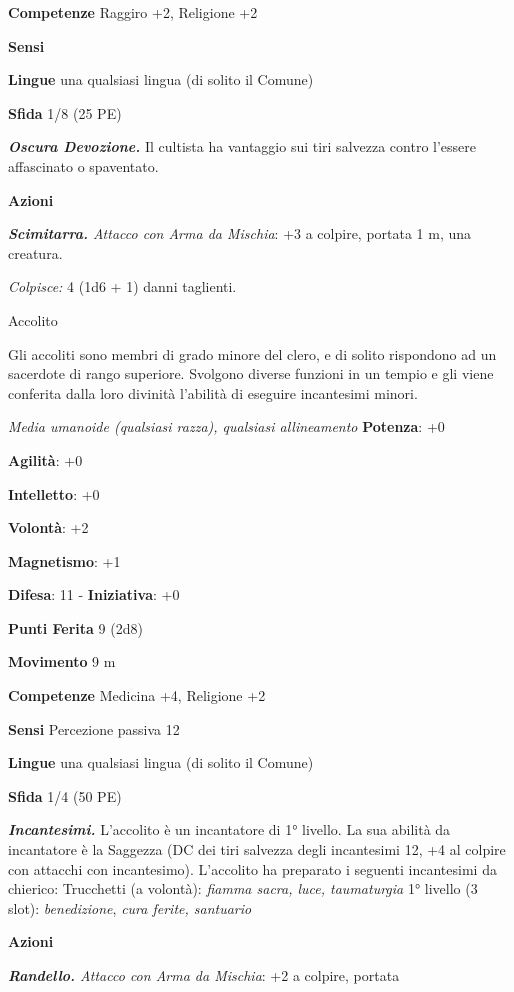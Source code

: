 \begin{multicols}{2}
\textbf{Competenze} Raggiro +2, Religione +2

\textbf{Sensi} 

\textbf{Lingue} una qualsiasi lingua (di solito il Comune)

\textbf{Sfida} 1/8 (25 PE)\smallskip

\emph{\textbf{Oscura Devozione.}} Il cultista ha vantaggio sui tiri
salvezza contro l'essere affascinato o spaventato.

\smallskip\textbf{Azioni}

\emph{\textbf{Scimitarra.} Attacco con Arma da Mischia}: +3 a colpire,
portata 1 m, una creatura.

\emph{Colpisce:} 4 (1d6 + 1) danni taglienti.

Accolito

Gli accoliti sono membri di grado minore del clero, e di solito
rispondono ad un sacerdote di rango superiore. Svolgono diverse funzioni
in un tempio e gli viene conferita dalla loro divinità l'abilità di
eseguire incantesimi minori.

\emph{Media umanoide (qualsiasi razza), qualsiasi allineamento}
\textbf{Potenza}: +0

\textbf{Agilità}: +0

\textbf{Intelletto}: +0

\textbf{Volontà}: +2

\textbf{Magnetismo}: +1

\textbf{Difesa}: 11 - \textbf{Iniziativa}: +0

\textbf{Punti Ferita} 9 (2d8)

\textbf{Movimento} 9 m

\textbf{Competenze} Medicina +4, Religione +2

\textbf{Sensi} Percezione passiva 12

\textbf{Lingue} una qualsiasi lingua (di solito il Comune)

\textbf{Sfida} 1/4 (50 PE)\smallskip

\emph{\textbf{Incantesimi.}} L'accolito è un incantatore di 1° livello.
La sua abilità da incantatore è la Saggezza (DC dei tiri salvezza degli
incantesimi 12, +4 al colpire con attacchi con incantesimo). L'accolito
ha preparato i seguenti incantesimi da chierico: Trucchetti (a volontà):
\emph{fiamma sacra, luce, taumaturgia} 1° livello (3 slot):
\emph{benedizione}, \emph{cura ferite, santuario}

\smallskip\textbf{Azioni}


\emph{\textbf{Randello.} Attacco con Arma da Mischia}: +2 a colpire,
portata


\end{multicols}
